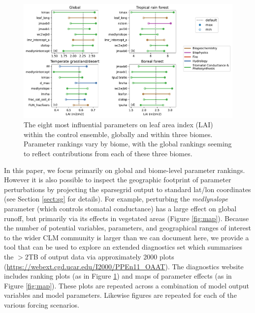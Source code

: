 \documentclass[draft]{agujournal2019}
\begin{document}
\begin{figure}[h]
\centering
\includegraphics[width=\textwidth]{../figs/main/lai_biome.pdf}
\caption{The eight most influential parameters  on leaf area index (LAI) within the control ensemble, globally and within three biomes.  Parameter rankings vary by biome, with the global rankings seeming to reflect contributions from each of these three biomes.}
\label{fig:lai}
\end{figure}

In this paper, we focus primarily on global and biome-level parameter rankings. However it is also possible to inspect the geographic footprint of parameter perturbations by projecting the sparsegrid output to standard lat/lon coordinates (see Section \ref{sect:sg} for details). For example, perturbing the \textit{medlynslope} parameter (which controls stomatal conductance) has a large effect on global runoff, but primarily via its effects in vegetated areas (Figure \ref{fig:map}). 
Because the number of potential variables, parameters, and geographical ranges of interest to the wider CLM community is larger than we can document here,  we provide a tool that can be used to explore an extended diagnostics set which summarises the $>$2TB of output data via approximately 2000 plots (\url{https://webext.cgd.ucar.edu/I2000/PPEn11_OAAT}). The diagnostics website includes ranking plots (as in Figure \ref{fig:lai}) and maps of parameter effects (as in Figure \ref{fig:map}). These plots are repeated across a combination of model output variables and model parameters. Likewise figures are repeated for each of the various forcing scenarios. 
\end{document}
